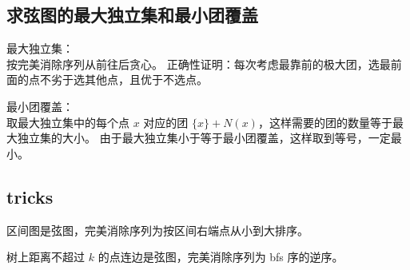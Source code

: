 \subsection{求弦图的最大独立集和最小团覆盖}

最大独立集：\\
按完美消除序列从前往后贪心。  
正确性证明：每次考虑最靠前的极大团，选最前面的点不劣于选其他点，且优于不选点。

最小团覆盖：\\
取最大独立集中的每个点 $x$ 对应的团 $\{x\} + N(x)$，这样需要的团的数量等于最大独立集的大小。  
由于最大独立集小于等于最小团覆盖，这样取到等号，一定最小。

\subsection{tricks}

区间图是弦图，完美消除序列为按区间右端点从小到大排序。

树上距离不超过 $k$ 的点连边是弦图，完美消除序列为 bfs 序的逆序。